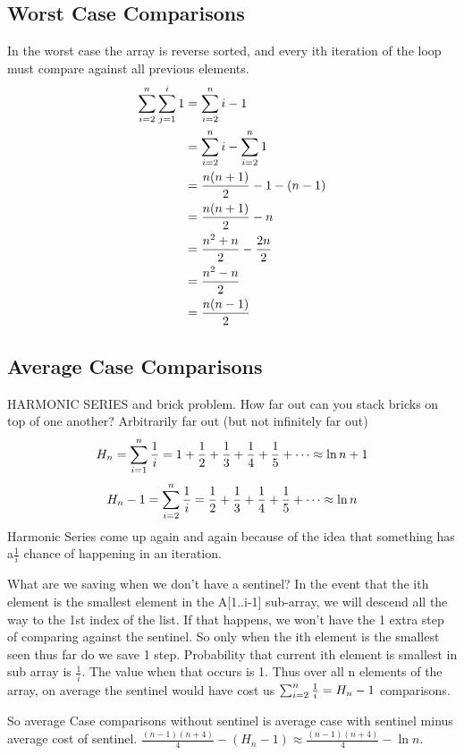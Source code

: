 \documentclass[english, 10pt]{article}
\begin{document}
\subsection{Worst Case Comparisons}
In the worst case the array is reverse sorted, and every ith iteration of the loop must compare against all previous elements.
\begin{align*}
    \sum_{i=2}^{n}\sum_{j=1}^{i}1 &= \sum_{i=2}^{n} i-1 \\
    &= \sum_{i=2}^{n} i - \sum_{i=2}^{n} 1 \\
    &= \frac{n(n+1)}{2} -1 -(n-1) \\
    &= \frac{n(n+1)}{2} -n \\
    &= \frac{n^2 + n}{2} -\frac{2n}{2} \\
    &= \frac{n^2 - n}{2} \\
    &= \frac{n(n-1)}{2} \\
\end{align*}


\subsection{Average Case Comparisons}
\begin{rem}
HARMONIC SERIES and brick problem.
How far out can you stack bricks on top of one another? Arbitrarily far out (but not infinitely far out)
$$H_n = \sum_{i=1}^{n}\frac{1}{i} = 1+\frac{1}{2}+\frac{1}{3}+\frac{1}{4}+\frac{1}{5}+\cdots \approx \ln{n}+1$$
$$H_n -1 = \sum_{i=2}^{n}\frac{1}{i} = \frac{1}{2}+\frac{1}{3}+\frac{1}{4}+\frac{1}{5}+\cdots \approx \ln{n}$$
Harmonic Series come up again and again because of the idea that something has a$ \frac{1}{i}$ chance of happening in an iteration.
\end{rem}
What are we saving when we don't have a sentinel? In the event that the ith element is the smallest element in the A[1..i-1] sub-array, we will descend all
the way to the 1st index of the list. If that happens, we won't have the 1 extra step of comparing against the sentinel. So only when the ith element is
the smallest seen thus far do we save 1 step.
Probability that current ith element is smallest in sub array is $\frac{1}{i}$. The value when that occurs is 1.
Thus over all n elements of the array, on average the sentinel would have cost us $\sum_{i=2}^{n}\frac{1}{i} = H_n -1$ comparisons.

So average Case comparisons without sentinel is average case with sentinel minus average cost of sentinel.
$\frac{(n-1)(n+4)}{4}-(H_n -1) \approx \frac{(n-1)(n+4)}{4}-\ln{n}$.
\end{document}
